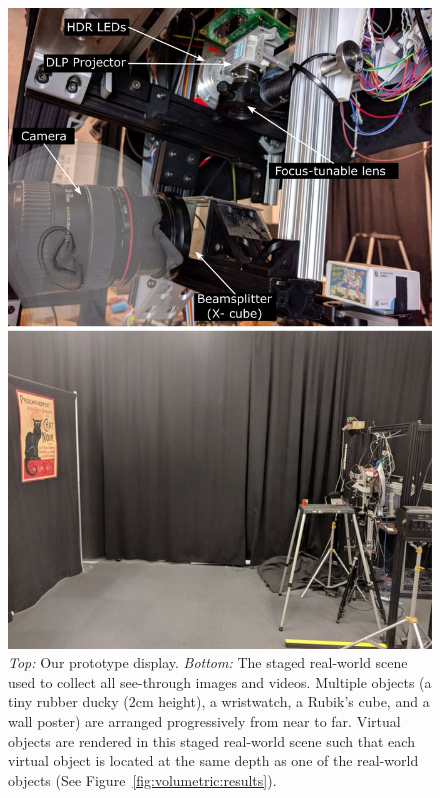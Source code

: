 \begin{figure}[tb!]
\centering
\includegraphics[width=0.8\columnwidth]{images/volumetric/setup}
\caption[Volumetric NED: Prototype and staged real-world scene for capturing results]{\emph{Top:} Our prototype display. \emph{Bottom:} The staged real-world scene used to collect all see-through images and videos. Multiple objects (a tiny rubber ducky (2cm height), a wristwatch, a Rubik's cube, and a wall poster) are arranged progressively from near to far. Virtual objects are rendered in this staged real-world scene such that each virtual object is located at the same depth as one of the real-world objects (See Figure~\ref{fig:volumetric:results}).}
\label{fig:volumetric:setup}
\end{figure}


